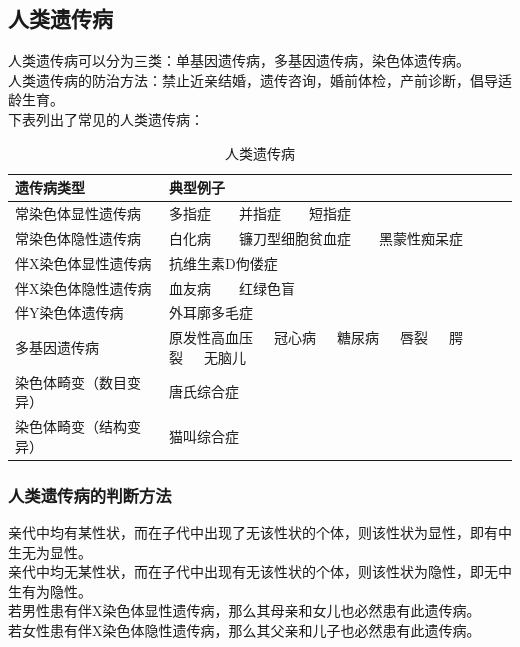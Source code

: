 \documentclass[UTF8]{ctexart}
\begin{document}
\newpage

\subsection{人类遗传病}
    人类遗传病可以分为三类：单基因遗传病，多基因遗传病，染色体遗传病。\\[3mm]
    人类遗传病的防治方法：禁止近亲结婚，遗传咨询，婚前体检，产前诊断，倡导适龄生育。\\[3mm]
    下表列出了常见的人类遗传病：\vspace{5pt}
    \begin{table}[h]
        \begin{center}
            \begin{tabular}{l|l}
                \hline
                遗传病类型\qquad\qquad&典型例子\qquad\qquad\qquad\qquad\qquad\qquad\\ \hline
                常染色体显性遗传病&多指症~~~~并指症~~~~短指症\\ \hline
                常染色体隐性遗传病&白化病~~~~镰刀型细胞贫血症~~~~黑蒙性痴呆症\\ \hline
                伴X染色体显性遗传病&抗维生素D佝偻症\\ \hline
                伴X染色体隐性遗传病&血友病~~~~红绿色盲\\ \hline
                伴Y染色体遗传病&外耳廓多毛症\\ \hline
                多基因遗传病&原发性高血压~~~冠心病~~~糖尿病~~~唇裂~~~腭裂~~~无脑儿\\ \hline
                染色体畸变（数目变异）&唐氏综合症\\ \hline
                染色体畸变（结构变异）&猫叫综合症\\ \hline
            \end{tabular} 
            \caption{人类遗传病}
        \end{center}
    \end{table}\vspace{-20pt}

\subsubsection{人类遗传病的判断方法}
    亲代中均有某性状，而在子代中出现了无该性状的个体，则该性状为显性，即有中生无为显性。\\[3mm]
    亲代中均无某性状，而在子代中出现有无该性状的个体，则该性状为隐性，即无中生有为隐性。\\[3mm]
    若男性患有伴X染色体显性遗传病，那么其母亲和女儿也必然患有此遗传病。\\[3mm]
    若女性患有伴X染色体隐性遗传病，那么其父亲和儿子也必然患有此遗传病。
    
\end{document}
